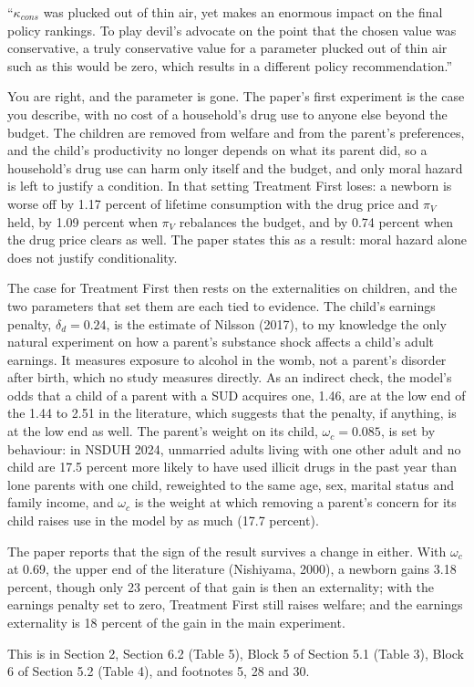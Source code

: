 \documentclass[11pt]{article}
\begin{document}
\begin{referee}
``$\kappa_{cons}$ was plucked out of thin air, yet makes an enormous impact on the
final policy rankings. To play devil's advocate on the point that the chosen value
was conservative, a truly conservative value for a parameter plucked out of thin
air such as this would be zero, which results in a different policy
recommendation.''
\end{referee}
\begin{response}
\concede You are right, and the parameter is gone. The paper's first experiment
is the case you describe, with no cost of a household's drug use to anyone else
beyond the budget. The children are removed from welfare and from the parent's
preferences, and the child's productivity no longer depends on what its parent
did, so a household's drug use can harm only itself and the budget, and only
moral hazard is left to justify a condition. In that setting Treatment First
loses: a newborn is worse off by 1.17 percent of lifetime consumption with the
drug price and $\pi_V$ held, by 1.09 percent when $\pi_V$ rebalances the budget,
and by 0.74 percent when the drug price clears as well. The paper states this as a result:
moral hazard alone does not justify conditionality.

The case for Treatment First then rests on the externalities on children, and the
two parameters that set them are each tied to evidence. The child's earnings
penalty, $\delta_d=0.24$, is the estimate of Nilsson (2017), to my knowledge the
only natural experiment on how a parent's substance shock affects a child's adult
earnings. It measures exposure to alcohol in the womb, not a parent's disorder
after birth, which no study measures directly. As an indirect check, the model's
odds that a child of a parent with a SUD acquires one, 1.46, are at the low end
of the 1.44 to 2.51 in the literature, which suggests that the penalty, if
anything, is at the low end as well. The parent's weight on its child,
$\omega_c=0.085$, is set by behaviour: in NSDUH 2024, unmarried adults living with
one other adult and no child are 17.5 percent more likely to have used illicit
drugs in the past year than lone parents with one child, reweighted to the same
age, sex, marital status and family income, and $\omega_c$ is the weight at which
removing a parent's concern for its child raises use in the model by as much
(17.7 percent).

The paper reports that the sign of the result survives a change in either. With
$\omega_c$ at 0.69, the upper end of the literature (Nishiyama, 2000), a newborn
gains 3.18 percent, though only 23 percent of that gain is then an externality;
with the earnings penalty set to zero, Treatment First still raises welfare; and
the earnings externality is 18 percent of the gain in the main experiment.

This is in Section 2, Section 6.2 (Table 5), Block 5 of Section 5.1 (Table 3),
Block 6 of Section 5.2 (Table 4), and footnotes 5, 28 and 30.
\end{response}
\end{document}
